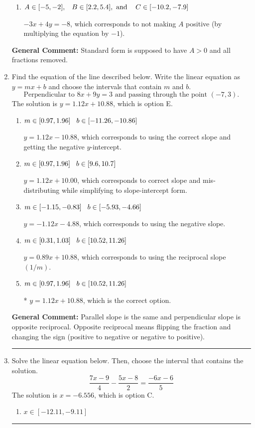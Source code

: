 \documentclass{extbook}[14pt]
\newcommand{\litem}[1]{\item #1

\rule{\textwidth}{0.4pt}}
\begin{document}
\begin{enumerate}
{\begin{enumerate}[label=\Alph*.]
 $-0.75x - 1y = 2.0$, which corresponds to using the opposite (negative) slope of the graph and not removing rational values.
\item \( A \in [-5, -2], \hspace{3mm} B \in [2.2, 5.4], \text{ and } \hspace{3mm} C \in [-10.2, -7.9] \)

 $-3x + 4y = -8$, which corresponds to not making $A$ positive (by multiplying the equation by $-1$).
\end{enumerate}

\textbf{General Comment:} Standard form is supposed to have $A > 0$ and all fractions removed.
}
\litem{
Find the equation of the line described below. Write the linear equation as $ y=mx+b $ and choose the intervals that contain $m$ and $b$.
\[ \text{Perpendicular to } 8 x + 9 y = 3 \text{ and passing through the point } (-7, 3). \]
The solution is \( y = 1.12x + 10.88 \), which is option E.\begin{enumerate}[label=\Alph*.]
\item \( m \in [0.97, 1.96] \hspace*{3mm} b \in [-11.26, -10.86] \)

 $y = 1.12x - 10.88$, which corresponds to using the correct slope and getting the negative $y$-intercept.
\item \( m \in [0.97, 1.96] \hspace*{3mm} b \in [9.6, 10.7] \)

 $y = 1.12x + 10.00$, which corresponds to correct slope and mis-distributing while simplifying to slope-intercept form.
\item \( m \in [-1.15, -0.83] \hspace*{3mm} b \in [-5.93, -4.66] \)

 $y = -1.12x - 4.88$, which corresponds to using the negative slope.
\item \( m \in [0.31, 1.03] \hspace*{3mm} b \in [10.52, 11.26] \)

 $y = 0.89x + 10.88$, which corresponds to using the reciprocal slope $(1/m)$.
\item \( m \in [0.97, 1.96] \hspace*{3mm} b \in [10.52, 11.26] \)

* $y = 1.12x + 10.88$, which is the correct option.
\end{enumerate}

\textbf{General Comment:} Parallel slope is the same and perpendicular slope is opposite reciprocal. Opposite reciprocal means flipping the fraction and changing the sign (positive to negative or negative to positive).
}
\litem{
Solve the linear equation below. Then, choose the interval that contains the solution.
\[ \frac{7x -9}{4} - \frac{5x -8}{2} = \frac{-6x -6}{5} \]
The solution is \( x = -6.556 \), which is option C.\begin{enumerate}[label=\Alph*.]
\item \( x \in [-12.11, -9.11] \)


\end{enumerate}}
\end{enumerate}
\end{document}
